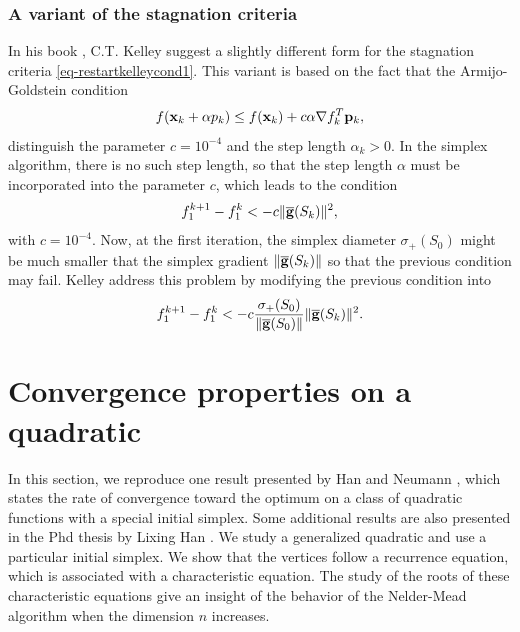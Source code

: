 \subsubsection{A variant of the stagnation criteria}

In his book \cite{Kelley1999}, C.T. Kelley suggest a slightly different 
form for the stagnation criteria \ref{eq-restartkelleycond1}.
This variant is based on the fact that the Armijo-Goldstein 
condition 
\begin{eqnarray}
f ( \mathbf{x}_k + \alpha p_k) \leq f(\mathbf{x}_k) + c \alpha \nabla f_k^T \mathbf{p}_k,
\end{eqnarray}
distinguish the parameter $c=10^{-4}$ and the step length $\alpha_k>0$.
In the simplex algorithm, there is no such step length, so that the 
step length $\alpha$ must be incorporated into the parameter $c$, which leads to the 
condition 
\begin{eqnarray}
f_1^{k+1} - f_1^k < - c \| \overline{\mathbf{g}}(S_k) \|^2,
\end{eqnarray}
with $c=10^{-4}$.
Now, at the first iteration, the simplex diameter $\sigma_+(S_0)$ might be 
much smaller that the simplex gradient $\| \overline{\mathbf{g}}(S_k) \|$
so that the previous condition may fail.
Kelley address this problem by modifying the previous condition into
\begin{eqnarray}
f_1^{k+1} - f_1^k < - c \frac{\sigma_+(S_0)}{\| \overline{\mathbf{g}}(S_0) \|} \| \overline{\mathbf{g}}(S_k) \|^2.
\end{eqnarray}

\section{Convergence properties on a quadratic}


In this section, we reproduce one result 
presented by Han and Neumann \cite{HanNeumann2006}, which states 
the rate of convergence toward the optimum on a class of quadratic 
functions with a special initial simplex.
Some additional results are also presented in the Phd thesis by Lixing Han \cite{Han2000}.
We study a generalized quadratic and use a particular 
initial simplex. We show that the vertices follow 
a recurrence equation, which is associated with a characteristic 
equation. The study of the roots of these characteristic equations 
give an insight of the behavior of the Nelder-Mead algorithm
when the dimension $n$ increases.

